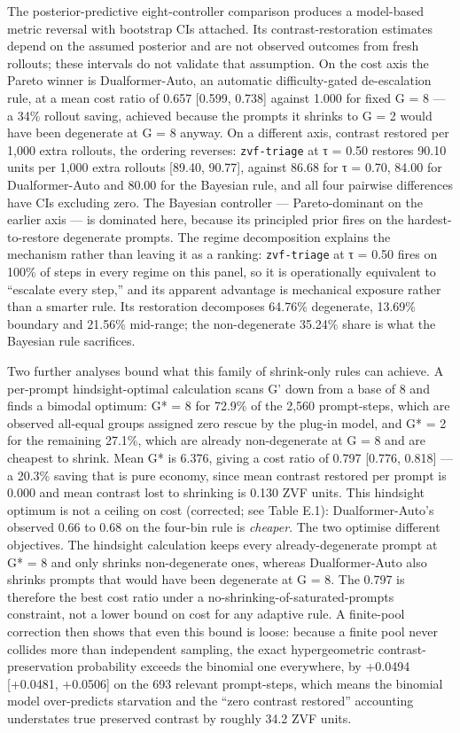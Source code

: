 \documentclass[12pt,a4paper]{report}
\begin{document}
The posterior-predictive eight-controller comparison produces a
model-based metric reversal with bootstrap CIs attached. Its
contrast-restoration estimates depend on the assumed posterior and are
not observed outcomes from fresh rollouts; these intervals do not
validate that assumption. On the cost axis the Pareto winner is
Dualformer-Auto, an automatic difficulty-gated de-escalation rule, at a
mean cost ratio of 0.657 {[}0.599, 0.738{]} against 1.000 for fixed G =
8 --- a 34\% rollout saving, achieved because the prompts it shrinks to
G = 2 would have been degenerate at G = 8 anyway. On a different axis,
contrast restored per 1,000 extra rollouts, the ordering reverses:
\texttt{zvf-triage} at τ = 0.50 restores 90.10 units per 1,000 extra
rollouts {[}89.40, 90.77{]}, against 86.68 for τ = 0.70, 84.00 for
Dualformer-Auto and 80.00 for the Bayesian rule, and all four pairwise
differences have CIs excluding zero. The Bayesian controller ---
Pareto-dominant on the earlier axis --- is dominated here, because its
principled prior fires on the hardest-to-restore degenerate prompts. The
regime decomposition explains the mechanism rather than leaving it as a
ranking: \texttt{zvf-triage} at τ = 0.50 fires on 100\% of steps in
every regime on this panel, so it is operationally equivalent to
``escalate every step,'' and its apparent advantage is mechanical
exposure rather than a smarter rule. Its restoration decomposes 64.76\%
degenerate, 13.69\% boundary and 21.56\% mid-range; the non-degenerate
35.24\% share is what the Bayesian rule sacrifices.

Two further analyses bound what this family of shrink-only rules can
achieve. A per-prompt hindsight-optimal calculation scans G' down from a
base of 8 and finds a bimodal optimum: G* = 8 for 72.9\% of the 2,560
prompt-steps, which are observed all-equal groups assigned zero rescue
by the plug-in model, and G* = 2 for the remaining 27.1\%, which are
already non-degenerate at G = 8 and are cheapest to shrink. Mean G* is
6.376, giving a cost ratio of 0.797 {[}0.776, 0.818{]} --- a 20.3\%
saving that is pure economy, since mean contrast restored per prompt is
0.000 and mean contrast lost to shrinking is 0.130 ZVF units. This
hindsight optimum is not a ceiling on cost (corrected; see Table E.1):
Dualformer-Auto's observed 0.66 to 0.68 on the four-bin rule is
\emph{cheaper}. The two optimise different objectives. The hindsight
calculation keeps every already-degenerate prompt at G* = 8 and only
shrinks non-degenerate ones, whereas Dualformer-Auto also shrinks
prompts that would have been degenerate at G = 8. The 0.797 is therefore
the best cost ratio under a no-shrinking-of-saturated-prompts
constraint, not a lower bound on cost for any adaptive rule. A
finite-pool correction then shows that even this bound is loose: because
a finite pool never collides more than independent sampling, the exact
hypergeometric contrast-preservation probability exceeds the binomial
one everywhere, by +0.0494 {[}+0.0481, +0.0506{]} on the 693 relevant
prompt-steps, which means the binomial model over-predicts starvation
and the ``zero contrast restored'' accounting understates true preserved
contrast by roughly 34.2 ZVF units.
\end{document}
